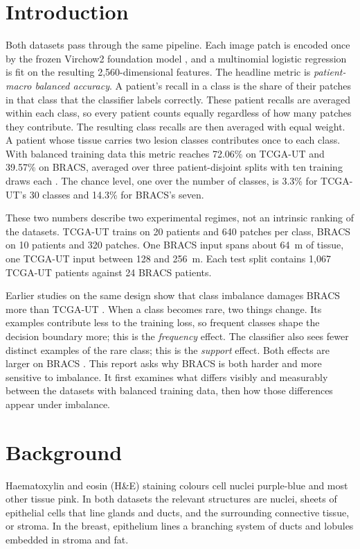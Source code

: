 \documentclass[11pt]{article}
\begin{document}
\section{Introduction}
\label{sec:intro}
Both datasets pass through the same pipeline. Each image patch is encoded once by the frozen Virchow2 foundation model \citep{zimmermann2024virchow2}, and a multinomial logistic regression is fit on the resulting 2,560-dimensional features. The headline metric is \emph{patient-macro balanced accuracy}. A patient's recall in a class is the share of their patches in that class that the classifier labels correctly. These patient recalls are averaged within each class, so every patient counts equally regardless of how many patches they contribute. The resulting class recalls are then averaged with equal weight. A patient whose tissue carries two lesion classes contributes once to each class. With balanced training data this metric reaches 72.06\% on TCGA-UT and 39.57\% on BRACS, averaged over three patient-disjoint splits with ten training draws each \citep{queisler2026prevalenceTcga, queisler2026prevalenceBracs}. The chance level, one over the number of classes, is 3.3\% for TCGA-UT's 30 classes and 14.3\% for BRACS's seven.

These two numbers describe two experimental regimes, not an intrinsic ranking of the datasets. TCGA-UT trains on 20 patients and 640 patches per class, BRACS on 10 patients and 320 patches. One BRACS input spans about 64~\textmu m of tissue, one TCGA-UT input between 128 and 256~\textmu m. Each test split contains 1,067 TCGA-UT patients against 24 BRACS patients.

Earlier studies on the same design show that class imbalance damages BRACS more than TCGA-UT \citep{queisler2026prevalenceTcga, queisler2026prevalenceBracs}. When a class becomes rare, two things change. Its examples contribute less to the training loss, so frequent classes shape the decision boundary more; this is the \emph{frequency} effect. The classifier also sees fewer distinct examples of the rare class; this is the \emph{support} effect. Both effects are larger on BRACS \citep{queisler2026causeTcga, queisler2026causeBracs}. This report asks why BRACS is both harder and more sensitive to imbalance. It first examines what differs visibly and measurably between the datasets with balanced training data, then how those differences appear under imbalance.

\section{Background}
\label{sec:tissue}
Haematoxylin and eosin (H\&E) staining colours cell nuclei purple-blue and most other tissue pink. In both datasets the relevant structures are nuclei, sheets of epithelial cells that line glands and ducts, and the surrounding connective tissue, or stroma. In the breast, epithelium lines a branching system of ducts and lobules embedded in stroma and fat.
\end{document}
